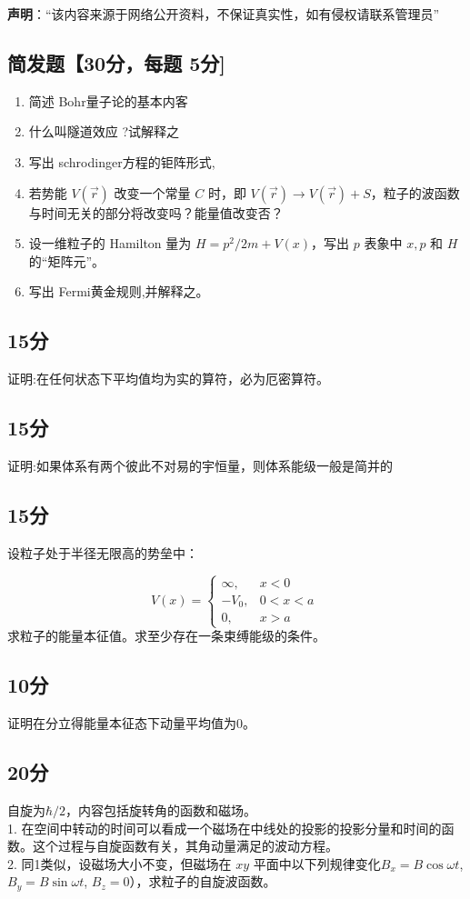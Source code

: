 
\textbf{声明}：“该内容来源于网络公开资料，不保证真实性，如有侵权请联系管理员”

\subsection{简发题【30分，每题 5分]}
\begin{enumerate}
\item 简述 Bohr量子论的基本内客
\item 什么叫隧道效应 ?试解释之
\item 写出 schrodinger方程的钜阵形式,
\item 若势能 $V(\vec{r})$ 改变一个常量 $C$ 时，即 $V(\vec{r}) \rightarrow V(\vec{r}) + S$，粒子的波函数与时间无关的部分将改变吗？能量值改变否？
\item 设一维粒子的 Hamilton 量为 $H = p^2/2m + V(x)$，写出 $p$ 表象中 $x, p$ 和 $H$ 的“矩阵元”。
\item 写出 Fermi黄金规则,并解释之。
\end{enumerate}
\subsection{15分}
证明:在任何状态下平均值均为实的算符，必为厄密算符。
\subsection{15分}
证明:如果体系有两个彼此不对易的宇恒量，则体系能级一般是简并的
\subsection{15分}
设粒子处于半径无限高的势垒中：

\[
V(x) =
\begin{cases}
\infty, & x < 0 \\
-V_0, & 0 < x < a \\
0, & x > a
\end{cases}~
\]
求粒子的能量本征值。求至少存在一条束缚能级的条件。
\subsection{10分}
证明在分立得能量本征态下动量平均值为0。
\subsection{20分}
自旋为$\hbar/2$，内容包括旋转角的函数和磁场。\\
1. 在空间中转动的时间可以看成一个磁场在中线处的投影的投影分量和时间的函数。这个过程与自旋函数有关，其角动量满足的波动方程。\\
2. 同1类似，设磁场大小不变，但磁场在 $x y $ 平面中以下列规律变化$B_x = B \cos \omega t$, $B_y = B \sin \omega t$, $B_z = 0$），求粒子的自旋波函数。